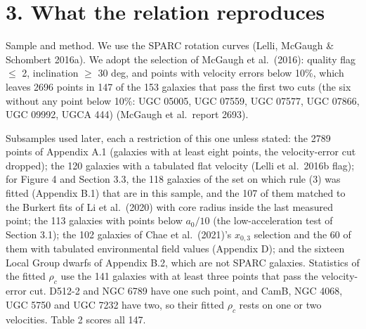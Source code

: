 \documentclass[
  10pt,
]{article}
\begin{document}
\section{3. What the relation reproduces}\label{what-the-law-reproduces}

Sample and method. We use the SPARC rotation curves (Lelli, McGaugh \& Schombert 2016a). We adopt the selection of McGaugh et al.~(2016): quality flag $\le$ 2, inclination $\ge$ 30 deg, and points with velocity errors below 10\%, which leaves 2696 points in 147 of the 153 galaxies that pass the first two cuts (the six without any point below 10\%: UGC 05005, UGC 07559, UGC 07577, UGC 07866, UGC 09992, UGCA 444) (McGaugh et al.\ report 2693).

Subsamples used later, each a restriction of this one unless stated: the 2789 points of Appendix A.1 (galaxies with at least eight points, the velocity-error cut dropped); the 120 galaxies with a tabulated flat velocity (Lelli et al.~2016b flag); for Figure 4 and Section 3.3, the 118 galaxies of the set on which rule (3) was fitted (Appendix B.1) that are in this sample, and the 107 of them matched to the Burkert fits of Li et al.~(2020) with core radius inside the last measured point; the 113 galaxies with points below $a_0/10$ (the low-acceleration test of Section 3.1); the 102 galaxies of Chae et al.~(2021)'s $x_{0,3}$ selection and the 60 of them with tabulated environmental field values (Appendix D); and the sixteen Local Group dwarfs of Appendix B.2, which are not SPARC galaxies. Statistics of the fitted $\rho_c$ use the 141 galaxies with at least three points that pass the velocity-error cut. D512-2 and NGC 6789 have one such point, and CamB, NGC 4068, UGC 5750 and UGC 7232 have two, so their fitted $\rho_c$ rests on one or two velocities. Table 2 scores all 147.
\end{document}
